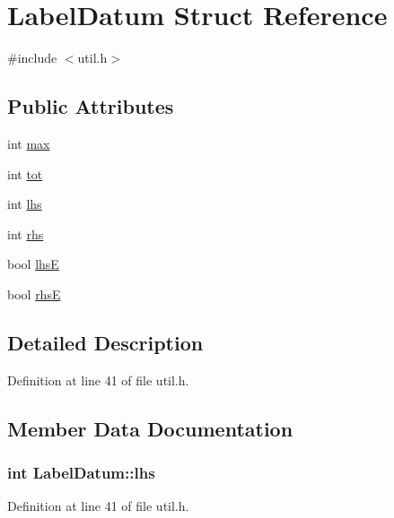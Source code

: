 \hypertarget{struct_label_datum}{}\section{Label\+Datum Struct Reference}
\label{struct_label_datum}


{\ttfamily \#include $<$util.\+h$>$}

\subsection*{Public Attributes}
\begin{DoxyCompactItemize}
\item 
int \hyperlink{struct_label_datum_ad12ade588686bd305fd6db8fb2bf65b3}{max}
\item 
int \hyperlink{struct_label_datum_a2a1456e3ecb8e615959b17d9592e4fdd}{tot}
\item 
int \hyperlink{struct_label_datum_ac735b1257d3ac02397d5d00504ac3c49}{lhs}
\item 
int \hyperlink{struct_label_datum_a78490546433503593378e5a51d25357d}{rhs}
\item 
bool \hyperlink{struct_label_datum_a090f9cb87d5c86357e8541cfa5734987}{lhsE}
\item 
bool \hyperlink{struct_label_datum_a3c8e06212069ae651190dbacaf51c293}{rhsE}
\end{DoxyCompactItemize}


\subsection{Detailed Description}


Definition at line 41 of file util.\+h.



\subsection{Member Data Documentation}
\subsubsection[{lhs}]{\setlength{\rightskip}{0pt plus 5cm}int Label\+Datum\+::lhs}\hypertarget{struct_label_datum_ac735b1257d3ac02397d5d00504ac3c49}{}\label{struct_label_datum_ac735b1257d3ac02397d5d00504ac3c49}


Definition at line 41 of file util.\+h.


